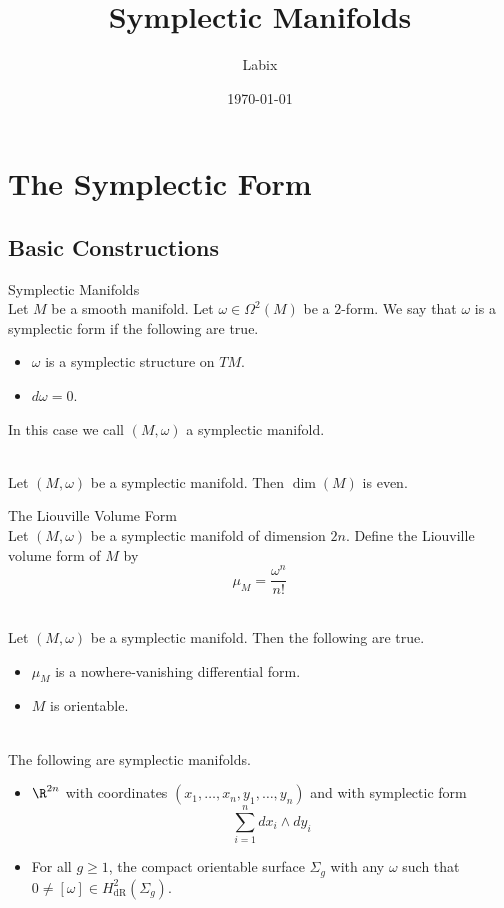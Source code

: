\documentclass[a4paper]{article}
\title{Symplectic Manifolds}
\author{Labix}
\date{\today}
\begin{document}
\maketitle
\begin{abstract}
\end{abstract}
\pagebreak
\tableofcontents

\pagebreak
\section{The Symplectic Form}
\subsection{Basic Constructions}
\begin{defn}{Symplectic Manifolds}{}\\
Let $M$ be a smooth manifold. Let $\omega\in\Omega^2(M)$ be a $2$-form. We say that $\omega$ is a symplectic form if the following are true. 
\begin{itemize}
\item $\omega$ is a symplectic structure on $TM$. 
\item $d\omega=0$. 
\end{itemize}
In this case we call $(M,\omega)$ a symplectic manifold. 
\end{defn}

\begin{lmm}{}{}\\
Let $(M,\omega)$ be a symplectic manifold. Then $\dim(M)$ is even. 
\end{lmm}

\begin{defn}{The Liouville Volume Form}{}\\
Let $(M,\omega)$ be a symplectic manifold of dimension $2n$. Define the Liouville volume form of $M$ by $$\mu_M=\frac{\omega^n}{n!}$$
\end{defn}

\begin{prp}{}{}\\
Let $(M,\omega)$ be a symplectic manifold. Then the following are true. 
\begin{itemize}
\item $\mu_M$ is a nowhere-vanishing differential form. 
\item $M$ is orientable. 
\end{itemize}
\end{prp}

\begin{eg}{}{}\\
The following are symplectic manifolds. 
\begin{itemize}
\item $\R^{2n}$ with coordinates $(x_1,\dots,x_n,y_1,\dots,y_n)$ and with symplectic form $$\sum_{i=1}^ndx_i\wedge dy_i$$
\item For all $g\geq 1$, the compact orientable surface $\Sigma_g$ with any $\omega$ such that $0\neq[\omega]\in H_\text{dR}^2(\Sigma_g)$. 
\end{itemize}
\end{eg}
\end{document}
